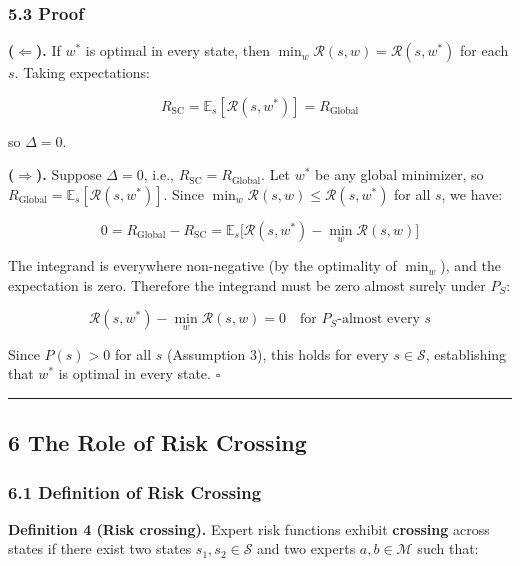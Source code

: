 \documentclass[
  12pt,
]{article}
\begin{document}
\subsubsection{5.3 Proof}\label{proof-1}

\textbf{(\(\Leftarrow\)).} If \(w^*\) is optimal in every state, then
\(\min_w \mathcal{R}(s, w) = \mathcal{R}(s, w^*)\) for each \(s\).
Taking expectations:

\[R_{\text{SC}} = \mathbb{E}_s[\mathcal{R}(s, w^*)] = R_{\text{Global}}\]

so \(\Delta = 0\).

\textbf{(\(\Rightarrow\)).} Suppose \(\Delta = 0\), i.e.,
\(R_{\text{SC}} = R_{\text{Global}}\). Let \(w^*\) be any global
minimizer, so \(R_{\text{Global}} = \mathbb{E}_s[\mathcal{R}(s, w^*)]\).
Since \(\min_w \mathcal{R}(s, w) \leq \mathcal{R}(s, w^*)\) for all
\(s\), we have:

\[0 = R_{\text{Global}} - R_{\text{SC}} = \mathbb{E}_s\bigl[\mathcal{R}(s, w^*) - \min_w \mathcal{R}(s, w)\bigr]\]

The integrand is everywhere non-negative (by the optimality of
\(\min_w\)), and the expectation is zero. Therefore the integrand must
be zero almost surely under \(P_S\):

\[\mathcal{R}(s, w^*) - \min_w \mathcal{R}(s, w) = 0 \quad \text{for } P_S\text{-almost every } s\]

Since \(P(s) > 0\) for all \(s\) (Assumption 3), this holds for every
\(s \in \mathcal{S}\), establishing that \(w^*\) is optimal in every
state. \(\square\)

\begin{center}\rule{0.5\linewidth}{0.5pt}\end{center}

\subsection{6 The Role of Risk
Crossing}\label{the-role-of-risk-crossing}

\subsubsection{6.1 Definition of Risk
Crossing}\label{definition-of-risk-crossing}

\textbf{Definition 4 (Risk crossing).} Expert risk functions exhibit
\textbf{crossing} across states if there exist two states
\(s_1, s_2 \in \mathcal{S}\) and two experts \(a, b \in \mathcal{M}\)
such that:
\end{document}
